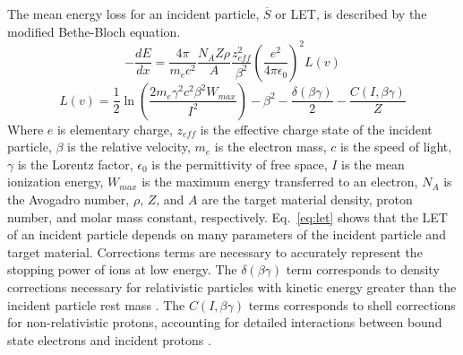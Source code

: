 The mean energy loss for an incident particle, $\overline{S}$ or LET, is described by the modified Bethe-Bloch equation.
\begin{equation}
    \label{eq:let}
    -\frac{dE}{dx} = \frac{4\pi}{m_e c^2} \frac{N_A Z \rho}{A} 
    \frac{z_{eff}^2}{\beta^2}\left(\frac{e^2}{4 \pi \epsilon_0}\right)^2 L(v)
\end{equation}
\begin{equation}
    \label{eq:bethe-bloch-corr-ion}
    L(v) = \frac{1}{2}\ln\left(\frac{2 m_e \gamma^2 c^2 \beta^2 W_{max}}{I^2}\right) - \beta^2 -\frac{\delta(\beta \gamma)}{2} - \frac{C(I,\beta \gamma)}{Z}
\end{equation}
Where $e$ is elementary charge, $z_{eff}$ is the effective charge state of the incident particle, $\beta$ is the relative velocity, $m_e$ is the electron mass, $c$ is the speed of light, $\gamma$ is the Lorentz factor, $\epsilon_0$ is the permittivity of free space, $I$ is the mean ionization energy, $W_{max}$ is the maximum energy transferred to an electron, $N_A$ is the Avogadro number, $\rho$, $Z$, and $A$ are the target material density, proton number, and molar mass constant, respectively.
Eq.~\ref{eq:let} shows that the LET of an incident particle depends on many parameters of the incident particle and target material. 
Corrections terms are necessary to accurately represent the stopping power of ions at low energy.
The $\delta(\beta \gamma)$ term corresponds to density corrections necessary for relativistic particles with kinetic energy greater than the incident particle rest mass \cite{ziegler2010srim}.
The $C(I,\beta \gamma)$ terms corresponds to shell corrections for non-relativistic protons, accounting for detailed interactions between bound state electrons and incident protons \cite{ziegler2010srim}.

